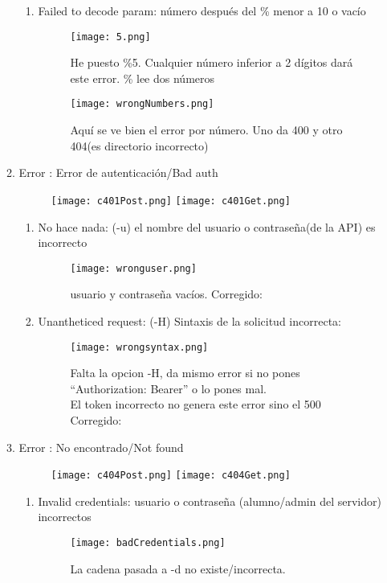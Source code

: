 \begin{enumerate}
\begin{enumerate}
\begin{enumerate}
			\item Failed to decode param: número después del \% menor a 10 o vacío
			\begin{figure}[H]
				\centering
				\texttt{[image: 5.png]}
				\caption{He puesto \%5. Cualquier número inferior a 2 dígitos dará este error. \% lee dos números}
			\end{figure}
			\begin{figure}[H]
				\centering
				\texttt{[image: wrongNumbers.png]}
				\caption{Aquí se ve bien el error por número. Uno da 400 y otro 404(es directorio incorrecto)}
			\end{figure}
		\end{enumerate}
		\item Error : Error de autenticación/Bad auth
		\begin{figure}[H]
			\centering
			\texttt{[image: c401Post.png]}
			\texttt{[image: c401Get.png]}
		\end{figure}
		\begin{enumerate}
			\item No hace nada: (-u) el nombre del usuario o contraseña(de la API) es incorrecto
			\begin{figure}[H]
				\centering
				\texttt{[image: wronguser.png]}
				\caption{usuario y contraseña vacíos. Corregido: }
			\end{figure}
		
			\item Unantheticed request: (-H) Sintaxis de la solicitud incorrecta:
			\begin{figure}[H]
				\centering
				\texttt{[image: wrongsyntax.png]}
				\caption{Falta la opcion -H, da mismo error si no pones “Authorization: Bearer” o lo pones mal.  \\
					El token incorrecto no genera este error sino el 500 \\
					Corregido: }
			\end{figure}
		\end{enumerate}
	
		\item Error : No encontrado/Not found
		\begin{figure}[H]
			\centering
			\texttt{[image: c404Post.png]}
			\texttt{[image: c404Get.png]}
		\end{figure}
		\begin{enumerate}
			\item Invalid credentials: usuario o contraseña (alumno/admin del servidor) incorrectos
			\begin{figure}[H]
				\centering
				\texttt{[image: badCredentials.png]}
				 \caption{La cadena pasada a -d no existe/incorrecta.}
			\end{figure}
			

\end{enumerate}
\end{enumerate}
\end{enumerate}
